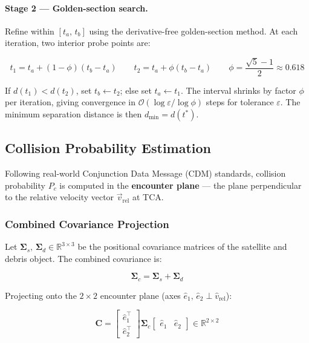 \documentclass[11pt, a4paper]{article}
\begin{document}
\paragraph{Stage 2 --- Golden-section search.} Refine within $[t_a,\, t_b]$ using the
derivative-free golden-section method. At each iteration, two interior probe points are:

\[
  t_1 = t_a + (1 - \phi)(t_b - t_a)
  \qquad
  t_2 = t_a + \phi(t_b - t_a)
  \qquad
  \phi = \frac{\sqrt{5}-1}{2} \approx 0.618
\]

If $d(t_1) < d(t_2)$, set $t_b \leftarrow t_2$; else set $t_a \leftarrow t_1$.
The interval shrinks by factor $\phi$ per iteration, giving convergence in
$\mathcal{O}\!\left(\log \varepsilon / \log \phi\right)$ steps for tolerance $\varepsilon$.
The minimum separation distance is then $d_{\min} = d(t^*)$.

\subsection{Collision Probability Estimation}

Following real-world Conjunction Data Message (CDM) standards, collision probability $P_c$ is
computed in the \textbf{encounter plane} --- the plane perpendicular to the relative velocity
vector $\vec{v}_{\text{rel}}$ at TCA.

\subsubsection{Combined Covariance Projection}

Let $\boldsymbol{\Sigma}_s,\, \boldsymbol{\Sigma}_d \in \mathbb{R}^{3\times3}$ be the positional
covariance matrices of the satellite and debris object. The combined covariance is:

\[
  \boldsymbol{\Sigma}_c = \boldsymbol{\Sigma}_s + \boldsymbol{\Sigma}_d
\]

Projecting onto the $2\times2$ encounter plane (axes $\hat{e}_1,\, \hat{e}_2 \perp \hat{v}_{\text{rel}}$):

\[
  \mathbf{C} =
  \begin{bmatrix} \hat{e}_1^\top \\ \hat{e}_2^\top \end{bmatrix}
  \boldsymbol{\Sigma}_c
  \begin{bmatrix} \hat{e}_1 & \hat{e}_2 \end{bmatrix}
  \in \mathbb{R}^{2 \times 2}
\]
\end{document}
